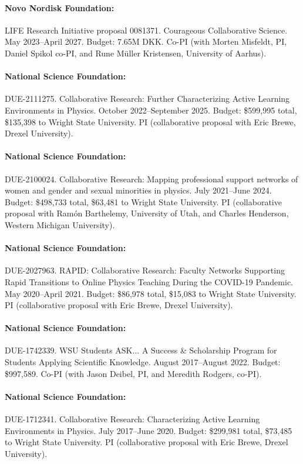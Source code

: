\documentclass[a4paper,10pt]{article}
\begin{document}
\paragraph{Novo Nordisk Foundation:} LIFE Research Initiative proposal 0081371. Courageous Collaborative Science. May 2023--April 2027. Budget: 7.65M DKK. Co-PI (with Morten Misfeldt, PI, Daniel Spikol co-PI, and Rune M\"{u}ller Kristensen, University of Aarhus).

\paragraph{National Science Foundation:} DUE-2111275. Collaborative Research: Further Characterizing Active Learning Environments in Physics. October 2022--September 2025. Budget: \$599,995
 total, \$135,398 to Wright State University. PI (collaborative proposal with Eric Brewe, Drexel University).

\paragraph{National Science Foundation:} DUE-2100024. Collaborative Research: Mapping professional support networks of women and gender and sexual minorities in physics. July 2021--June 2024. Budget: \$498,733 total, \$63,481 to Wright State University. PI (collaborative proposal with Ram\'{o}n Barthelemy, University of Utah, and Charles Henderson, Western Michigan University).

\paragraph{National Science Foundation:} DUE-2027963. RAPID: Collaborative Research: Faculty Networks Supporting Rapid Transitions to Online Physics Teaching During the COVID-19 Pandemic. May 2020--April 2021. Budget: \$86,978 total, \$15,083 to Wright State University. PI (collaborative proposal with Eric Brewe, Drexel University).

\paragraph{National Science Foundation:} DUE-1742339. WSU Students ASK$\ldots$ A Success \& Scholarship Program for Students Applying Scientific Knowledge. August 2017--August 2022. Budget: \$997,589. Co-PI (with Jason Deibel, PI, and Meredith Rodgers, co-PI).

\paragraph{National Science Foundation:} DUE-1712341. Collaborative Research: Characterizing Active Learning Environments in Physics. July 2017--June 2020. Budget: \$299,981 total, \$73,485 to Wright State University. PI (collaborative proposal with Eric Brewe, Drexel University).
\end{document}
